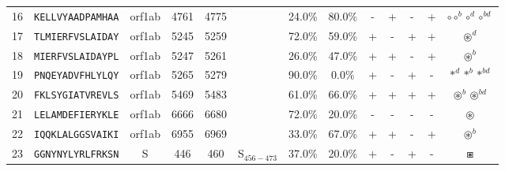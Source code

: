 \begin{tabular}{rcccccccccccc}
16 &  \texttt{KELLVYAADPAMHAA} &  orf1ab &   4761 &  4775 &                &                          24.0\% &                           80.0\% &          - &           + &          - &           + &                                                   $ \circ \circ^b \circ^d \circ^{bd} $ \\
17 &  \texttt{TLMIERFVSLAIDAY} &  orf1ab &   5245 &  5259 &                &                          72.0\% &                           59.0\% &          + &           - &          + &           + &                                                                      $ \circledast^d $ \\
18 &  \texttt{MIERFVSLAIDAYPL} &  orf1ab &   5247 &  5261 &                &                          26.0\% &                           47.0\% &          + &           + &          - &           + &                                                                      $ \circledast^b $ \\
19 &  \texttt{PNQEYADVFHLYLQY} &  orf1ab &   5265 &  5279 &                &                          90.0\% &                            0.0\% &          + &           - &          + &           - &                                                            $ \ast^d \ast^b \ast^{bd} $ \\
20 &  \texttt{FKLSYGIATVREVLS} &  orf1ab &   5469 &  5483 &                &                          61.0\% &                           66.0\% &          + &           + &          + &           + &                                                     $ \circledast^b \circledast^{bd} $ \\
21 &  \texttt{LELAMDEFIERYKLE} &  orf1ab &   6666 &  6680 &                &                          72.0\% &                           20.0\% &          - &           - &          - &           - &                                                                        $ \circledast $ \\
22 &  \texttt{IQQKLALGGSVAIKI} &  orf1ab &   6955 &  6969 &                &                          33.0\% &                           67.0\% &          + &           + &          - &           + &                                                                      $ \circledast^b $ \\
23 &  \texttt{GGNYNYLYRLFRKSN} &       S &    446 &   460 &  S$_{456-473}$ &                          37.0\% &                           20.0\% &          + &           - &          + &           - &                                                                            $ \boxast $ \\

\end{tabular}
